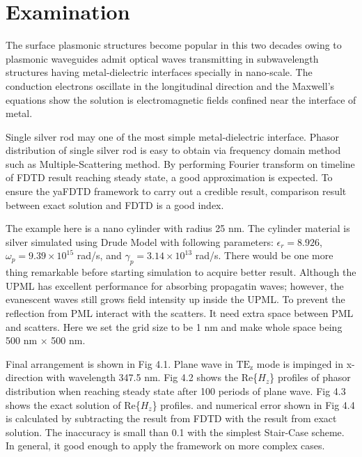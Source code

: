 \section{Examination}
The surface plasmonic structures become popular in this two decades owing to plasmonic waveguides admit optical waves
transmitting in subwavelength structures having metal-dielectric interfaces specially in nano-scale. The conduction
electrons oscillate in the longitudinal direction and the Maxwell's equations show the solution is electromagnetic
fields confined near the interface of metal.

Single silver rod may one of the most simple metal-dielectric interface. Phasor distribution of single silver rod is
easy to obtain via frequency domain method such as Multiple-Scattering method. By performing Fourier transform on
timeline of FDTD result reaching steady state, a good approximation is expected. To ensure the yaFDTD framework to carry
out a credible result, comparison result between exact solution and FDTD is a good index.

The example here is a nano cylinder with radius 25 nm. The cylinder material is silver simulated using Drude Model
with following parameters: $\epsilon_r = 8.926$, $\omega_p = 9.39 \times 10^{15}$ rad/s, and $\gamma_p = 3.14 \times
10^{13}$ rad/s.  There would be one more thing remarkable before starting simulation to acquire better result. Although
the UPML has excellent performance for absorbing propagatin waves; however, the evanescent waves still grows field
intensity up inside the UPML. To prevent the reflection from PML interact with the scatters. It need extra space between
PML and scatters. Here we set the grid size to be 1 nm and make whole space being 500 nm $\times$ 500 nm.

Final arrangement is shown in Fig 4.1. Plane wave in $\mathrm{TE_z}$ mode is impinged in x-direction with wavelength
347.5 nm. Fig 4.2 shows the Re\{$H_z$\} profiles of phasor distribution when reaching steady state after 100 periods of
plane wave. Fig 4.3 shows the exact solution of Re\{$H_z$\} profiles. and numerical error shown in Fig 4.4 is calculated
by subtracting the result from FDTD with the result from exact solution. The inaccuracy is small than 0.1 with the
simplest Stair-Case scheme. In general, it good enough to apply the framework on more complex cases.
